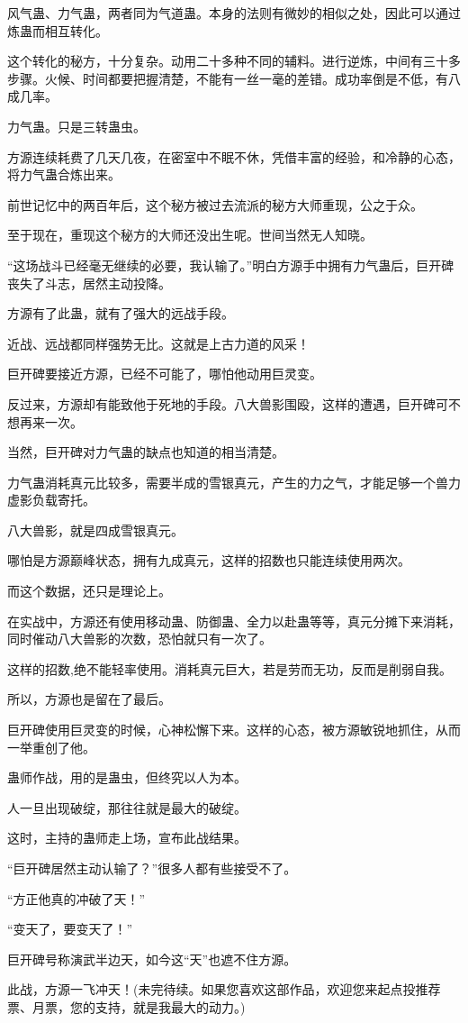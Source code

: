 \begin{this_body}
风气蛊、力气蛊，两者同为气道蛊。本身的法则有微妙的相似之处，因此可以通过炼蛊而相互转化。

这个转化的秘方，十分复杂。动用二十多种不同的辅料。进行逆炼，中间有三十多步骤。火候、时间都要把握清楚，不能有一丝一毫的差错。成功率倒是不低，有八成几率。

力气蛊。只是三转蛊虫。

方源连续耗费了几天几夜，在密室中不眠不休，凭借丰富的经验，和冷静的心态，将力气蛊合炼出来。

前世记忆中的两百年后，这个秘方被过去流派的秘方大师重现，公之于众。

至于现在，重现这个秘方的大师还没出生呢。世间当然无人知晓。

“这场战斗已经毫无继续的必要，我认输了。”明白方源手中拥有力气蛊后，巨开碑丧失了斗志，居然主动投降。

方源有了此蛊，就有了强大的远战手段。

近战、远战都同样强势无比。这就是上古力道的风采！

巨开碑要接近方源，已经不可能了，哪怕他动用巨灵变。

反过来，方源却有能致他于死地的手段。八大兽影围殴，这样的遭遇，巨开碑可不想再来一次。

当然，巨开碑对力气蛊的缺点也知道的相当清楚。

力气蛊消耗真元比较多，需要半成的雪银真元，产生的力之气，才能足够一个兽力虚影负载寄托。

八大兽影，就是四成雪银真元。

哪怕是方源巅峰状态，拥有九成真元，这样的招数也只能连续使用两次。

而这个数据，还只是理论上。

在实战中，方源还有使用移动蛊、防御蛊、全力以赴蛊等等，真元分摊下来消耗，同时催动八大兽影的次数，恐怕就只有一次了。

这样的招数,绝不能轻率使用。消耗真元巨大，若是劳而无功，反而是削弱自我。

所以，方源也是留在了最后。

巨开碑使用巨灵变的时候，心神松懈下来。这样的心态，被方源敏锐地抓住，从而一举重创了他。

蛊师作战，用的是蛊虫，但终究以人为本。

人一旦出现破绽，那往往就是最大的破绽。

这时，主持的蛊师走上场，宣布此战结果。

“巨开碑居然主动认输了？”很多人都有些接受不了。

“方正他真的冲破了天！”

“变天了，要变天了！”

巨开碑号称演武半边天，如今这“天”也遮不住方源。

此战，方源一飞冲天！(未完待续。如果您喜欢这部作品，欢迎您来起点投推荐票、月票，您的支持，就是我最大的动力。)

\end{this_body}

